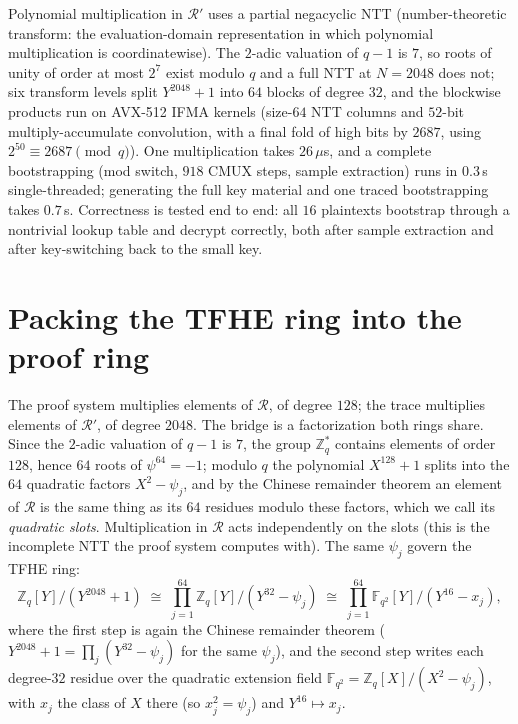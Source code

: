 \documentclass[11pt]{article}
\newcommand{\ZZ}{\mathbb{Z}}
\newcommand{\ring}{\mathcal{R}}
\newcommand{\tring}{\mathcal{R}'}
\begin{document}
Polynomial multiplication in $\tring$ uses a partial negacyclic NTT (number-theoretic transform: the evaluation-domain representation in which polynomial multiplication is coordinatewise). The $2$-adic valuation of $q - 1$ is $7$, so roots of unity of order at most $2^7$ exist modulo $q$ and a full NTT at $N = 2048$ does not; six transform levels split $Y^{2048} + 1$ into $64$ blocks of degree $32$, and the blockwise products run on AVX-512 IFMA kernels (size-$64$ NTT columns and $52$-bit multiply-accumulate convolution, with a final fold of high bits by $2687$, using $2^{50} \equiv 2687 \pmod q$). One multiplication takes $26\,\mu$s, and a complete bootstrapping (mod switch, $918$ CMUX steps, sample extraction) runs in $0.3$\,s single-threaded; generating the full key material and one traced bootstrapping takes $0.7$\,s. Correctness is tested end to end: all $16$ plaintexts bootstrap through a nontrivial lookup table and decrypt correctly, both after sample extraction and after key-switching back to the small key.

\section{Packing the TFHE ring into the proof ring}\label{sec:packing}

The proof system multiplies elements of $\ring$, of degree $128$; the trace multiplies elements of $\tring$, of degree $2048$. The bridge is a factorization both rings share. Since the $2$-adic valuation of $q - 1$ is $7$, the group $\ZZ_q^*$ contains elements of order $128$, hence $64$ roots of $\psi^{64} = -1$; modulo $q$ the polynomial $X^{128} + 1$ splits into the $64$ quadratic factors $X^2 - \psi_j$, and by the Chinese remainder theorem an element of $\ring$ is the same thing as its $64$ residues modulo these factors, which we call its \emph{quadratic slots}. Multiplication in $\ring$ acts independently on the slots (this is the incomplete NTT the proof system computes with). The same $\psi_j$ govern the TFHE ring:
\[
  \ZZ_q[Y]/(Y^{2048} + 1) \;\cong\; \prod_{j=1}^{64} \ZZ_q[Y]/(Y^{32} - \psi_j)
  \;\cong\; \prod_{j=1}^{64} \mathbb{F}_{q^2}[Y]/(Y^{16} - x_j),
\]
where the first step is again the Chinese remainder theorem ($Y^{2048} + 1 = \prod_j (Y^{32} - \psi_j)$ for the same $\psi_j$), and the second step writes each degree-$32$ residue over the quadratic extension field $\mathbb{F}_{q^2} = \ZZ_q[X]/(X^2 - \psi_j)$, with $x_j$ the class of $X$ there (so $x_j^2 = \psi_j$) and $Y^{16} \mapsto x_j$.
\end{document}
